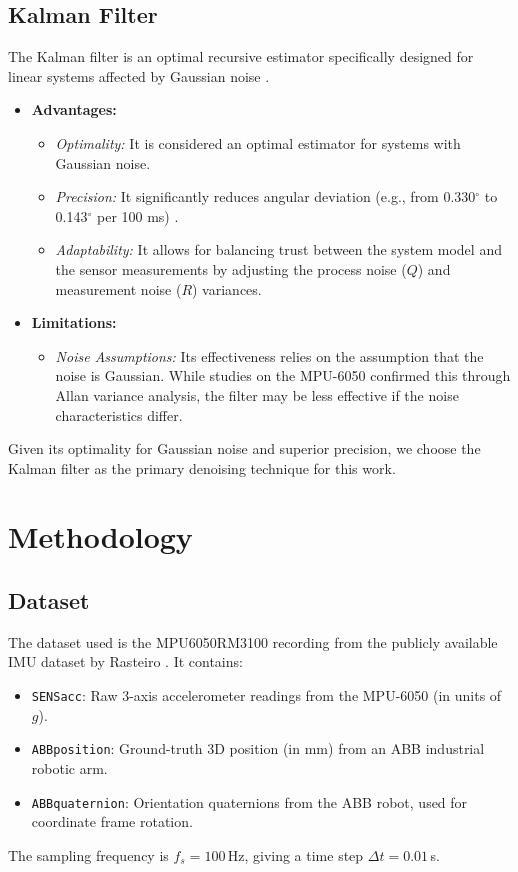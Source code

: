 \documentclass[12pt,a4paper]{article}
\begin{document}
\subsection{Kalman Filter}
The Kalman filter is an optimal recursive estimator specifically designed for linear systems affected by Gaussian noise \cite{lefferts1982}.
\begin{itemize}
    \item \textbf{Advantages:}
    \begin{itemize}
        \item \textit{Optimality:} It is considered an optimal estimator for systems with Gaussian noise.
        \item \textit{Precision:} It significantly reduces angular deviation (e.g., from 0.330$^\circ$ to 0.143$^\circ$ per 100 ms) \cite{nirmala2016}.
        \item \textit{Adaptability:} It allows for balancing trust between the system model and the sensor measurements by adjusting the process noise ($Q$) and measurement noise ($R$) variances.
    \end{itemize}
    \item \textbf{Limitations:}
    \begin{itemize}
        \item \textit{Noise Assumptions:} Its effectiveness relies on the assumption that the noise is Gaussian. While studies on the MPU-6050 confirmed this through Allan variance analysis, the filter may be less effective if the noise characteristics differ.
    \end{itemize}
\end{itemize}

Given its optimality for Gaussian noise and superior precision, we choose the Kalman filter as the primary denoising technique for this work.

\newpage
\section{Methodology}

\subsection{Dataset}
The dataset used is the MPU6050RM3100 recording from the publicly available IMU dataset by Rasteiro \cite{rasteiro_dataset}. It contains:
\begin{itemize}
    \item \texttt{SENSacc}: Raw 3-axis accelerometer readings from the MPU-6050 (in units of $g$).
    \item \texttt{ABBposition}: Ground-truth 3D position (in mm) from an ABB industrial robotic arm.
    \item \texttt{ABBquaternion}: Orientation quaternions from the ABB robot, used for coordinate frame rotation.
\end{itemize}
The sampling frequency is $f_s = 100$\,Hz, giving a time step $\Delta t = 0.01$\,s.
\end{document}
